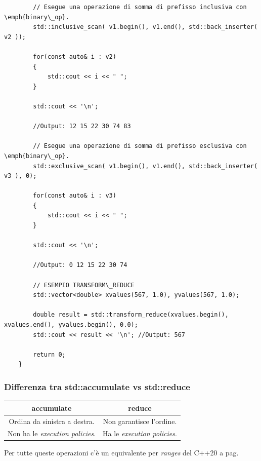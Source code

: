 \begin{lstlisting}
		// Esegue una operazione di somma di prefisso inclusiva con \emph{binary\_op}.
		std::inclusive_scan( v1.begin(), v1.end(), std::back_inserter( v2 ));
		
		for(const auto& i : v2)
		{
			std::cout << i << " ";
		}
		
		std::cout << '\n';
		
		//Output: 12 15 22 30 74 83
		
		// Esegue una operazione di somma di prefisso esclusiva con \emph{binary\_op}.
		std::exclusive_scan( v1.begin(), v1.end(), std::back_inserter( v3 ), 0);
		
		for(const auto& i : v3)
		{
			std::cout << i << " ";
		}
		
		std::cout << '\n';
		
		//Output: 0 12 15 22 30 74
		
		// ESEMPIO TRANSFORM\_REDUCE
		std::vector<double> xvalues(567, 1.0), yvalues(567, 1.0);
		
		double result = std::transform_reduce(xvalues.begin(), xvalues.end(), yvalues.begin(), 0.0);
		std::cout << result << '\n'; //Output: 567
		
		return 0;
	}
\end{lstlisting}


\subsubsection{Differenza tra std::accumulate vs std::reduce}

\begin{tabular}{|c|c|}
	\hline
	\textbf{accumulate} & \textbf{reduce} \\
	\hline
	\textsf{\small Ordina da sinistra a destra.} & \textsf{\small Non garantisce l'ordine.} \\
	\hline
	\textsf{\small Non ha le \emph{execution policies}.} & \textsf{\small Ha le \emph{execution policies}.} \\
	\hline
\end{tabular}

\fleuron

\textsf{\small Per tutte queste operazioni c'è un equivalente per \emph{ranges} del C++20 a pag. \pageref{ranges_numeric}} \\


